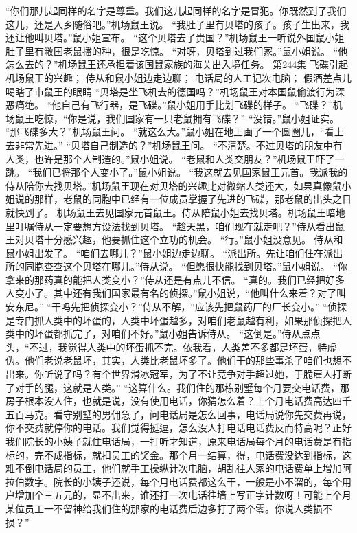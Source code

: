 \documentclass[a4paper,12pt,UTF8,twoside]{ctexbook}
\begin{document}
        “你们那儿起同样的名字是尊重。我们这儿起同样的名字是冒犯。你既然到了我们这儿，还是入乡随俗吧。”机场鼠王说。  
        “我肚子里有贝塔的孩子。孩子生出来，我还让他叫贝塔。”鼠小姐宣布。  
        “这个贝塔去了贵国？”机场鼠王一听说外国鼠小姐肚子里有敝国老鼠播的种，很是吃惊。  
        “对呀，贝塔到过我们家。”鼠小姐说。  
        “他怎么去的？”机场鼠王还承担着该国鼠家族的海关出入境任务。          第244集  
        飞碟引起机场鼠王的兴趣；  
        侍从和鼠小姐边走边聊；  
        电话局的人工记次电脑；  
        假酒差点儿喝瞎了市鼠王的眼睛    
        “贝塔是坐飞机去的德国吗？”机场鼠王对本国鼠偷渡行为深恶痛绝。  
        “他自己有飞行器，是飞碟。”鼠小姐用手比划飞碟的样子。  
        “飞碟？”机场鼠王吃惊，“你是说，我们国家有一只老鼠拥有飞碟？”  
        “没错。”鼠小姐证实。  
        “那飞碟多大？”机场鼠王问。  
        “就这么大。”鼠小姐在地上画了一个圆圈儿，“看上去非常先进。”  
        “贝塔自己制造的？”机场鼠王问。        
        “不清楚。不过贝塔的朋友中有人类，也许是那个人制造的。”鼠小姐说。  
        “老鼠和人类交朋友？”机场鼠王吓了一跳。  
        “我们已将那个人变小了。”鼠小姐说。  
        “我这就去见国家鼠王元首。我派我的侍从陪你去找贝塔。”机场鼠王现在对贝塔的兴趣比对微缩人类还大，如果真像鼠小姐说的那样，老鼠的同胞中已经有一位成员掌握了先进的飞碟，那老鼠的出头之日就快到了。  
        机场鼠王去见国家元首鼠王。侍从陪鼠小姐去找贝塔。机场鼠王暗地里叮嘱侍从一定要想方设法找到贝塔。  
        “趁天黑，咱们现在就走吧？”侍从看出鼠王对贝塔十分感兴趣，他要抓住这个立功的机会。  
        “行。”鼠小姐没意见。  
        侍从和鼠小姐出发了。  
        “咱们去哪儿？”鼠小姐边走边聊。  
        “派出所。先让咱们住在派出所的同胞查查这个贝塔在哪儿。”侍从说。  
        “但愿很快能找到贝塔。”鼠小姐说。  
        “你拿来的那药真的能把人类变小？”侍从还是有点儿不信。  
        “真的。我们已经把好多人变小了。其中还有我们国家最有名的侦探。”鼠小姐说，“他叫什么来着？对了叫安东尼。”  
        “干吗先把侦探变小？”侍从不解，“应该先把鼠药厂的厂长变小。”  
        “侦探是专门抓人类中的坏蛋的，人类中坏蛋越多，对咱们老鼠越有利，如果那侦探把人类中的坏蛋都抓完了，对咱们不好。”鼠小姐告诉侍从。  
        “这倒是。”侍从点点头，“不过，我觉得人类中的坏蛋抓不完。依我看，人类差不多都是坏蛋，特虚伪。他们老说老鼠坏，其实，人类比老鼠坏多了。他们干的那些事杀了咱们也想不出来。你听说了吗？有个世界滑冰冠军，为了不让竞争对手超过她，于脆雇人打断了对手的腿，这就是人类。”  
        “这算什么。我们住的那栋别墅每个月要交电话费，那房子根本没人住，也就是说，没有使用电话，你猜怎么着？上个月电话费高达四千五百马克。看守别墅的男佣急了，问电话局是怎么回事，电话局说你先交费再说，你不交费就停你的电话。我们觉得挺逗，怎么没人打电话电话费反而特高呢？正好我们院长的小姨子就住电话局，一打听才知道，原来电话局每个月的电话费是有指标的，完不成指标，就扣员工的奖金。那个月一结算，得，电话费没达到指标，这难不倒电话局的员工，他们就手工操纵计次电脑，胡乱往人家的电话费单上增加阿拉伯数字。院长的小姨子还说，每个月电话费都这么干，一般是小不溜的，每个用户增加个三五元的，显不出来，谁还打一次电话往墙上写正字计数呀！可能上个月某位员工一不留神给我们住的那家的电话费后边多打了两个零。你说人类损不损？”  
\end{document}
